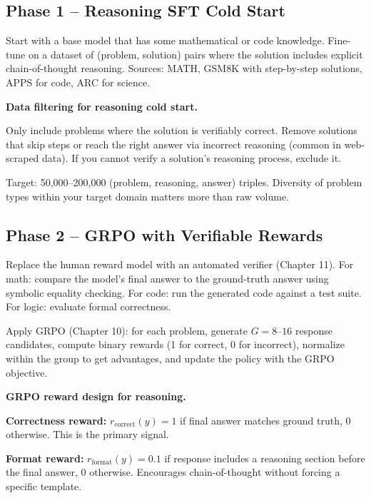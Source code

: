\begin{chapterenv}
\subsection{Phase 1 -- Reasoning SFT Cold Start}

Start with a base model that has some mathematical or code knowledge. Fine-tune on a dataset of (problem, solution) pairs where the solution includes explicit chain-of-thought reasoning. Sources: MATH, GSM8K with step-by-step solutions, APPS for code, ARC for science.

\begin{tipbox}
\textbf{Data filtering for reasoning cold start.}

Only include problems where the solution is verifiably correct. Remove solutions that skip steps or reach the right answer via incorrect reasoning (common in web-scraped data). If you cannot verify a solution's reasoning process, exclude it.

Target: 50,000--200,000 (problem, reasoning, answer) triples. Diversity of problem types within your target domain matters more than raw volume.
\end{tipbox}

\subsection{Phase 2 -- GRPO with Verifiable Rewards}

Replace the human reward model with an automated verifier (Chapter 11). For math: compare the model's final answer to the ground-truth answer using symbolic equality checking. For code: run the generated code against a test suite. For logic: evaluate formal correctness.

Apply GRPO (Chapter 10): for each problem, generate $G = 8$--$16$ response candidates, compute binary rewards (1 for correct, 0 for incorrect), normalize within the group to get advantages, and update the policy with the GRPO objective.

\begin{infobox}
\textbf{GRPO reward design for reasoning.}

\textbf{Correctness reward:} $r_{\text{correct}}(y) = 1$ if final answer matches ground truth, $0$ otherwise. This is the primary signal.

\textbf{Format reward:} $r_{\text{format}}(y) = 0.1$ if response includes a reasoning section before the final answer, $0$ otherwise. Encourages chain-of-thought without forcing a specific template.


\end{infobox}
\end{chapterenv}
